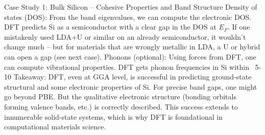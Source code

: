 \begin{frame}{Case Study 1: Bulk Silicon – Cohesive Properties and Band Structure}
Density of states (DOS): From the band eigenvalues, we can compute the electronic DOS. DFT predicts Si as a semiconductor with a clear gap in the DOS at $E_F$. If one mistakenly used LDA+U or similar on an already semiconductor, it wouldn’t change much – but for materials that are wrongly metallic in LDA, a U or hybrid can open a gap (see next case).
Phonons (optional): Using forces from DFT, one can compute vibrational properties. DFT gets phonon frequencies in Si within ~5-10%
Takeaway: DFT, even at GGA level, is successful in predicting ground-state structural and some electronic properties of Si. For precise band gaps, one might go beyond PBE. But the qualitative electronic structure (bonding orbitals forming valence bands, etc.) is correctly described. This success extends to innumerable solid-state systems, which is why DFT is foundational in computational materials science. \end{frame}


